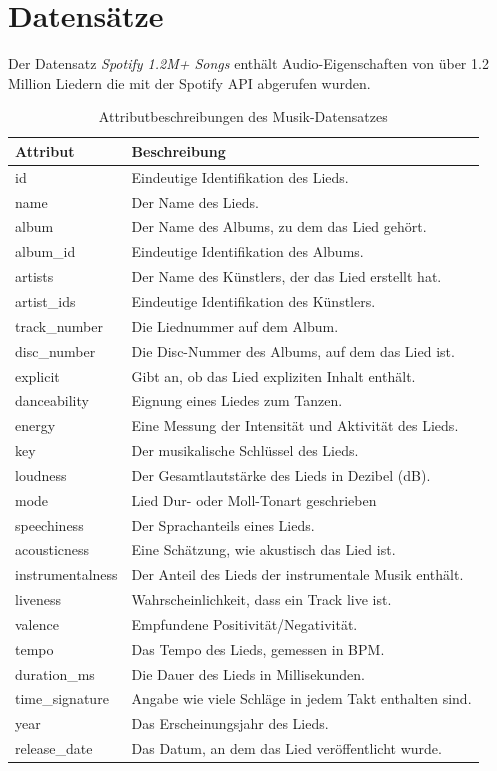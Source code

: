 \documentclass[conference]{IEEEtran}
\begin{document}
\section{Datensätze}
Der Datensatz \textit{Spotify 1.2M+ Songs} \cite{d2} enthält Audio-Eigenschaften von über 1.2 Million Liedern die mit der Spotify API abgerufen wurden.
\begin{table}[h]
\centering
\begin{tabular}{|l|l|}
\hline
Attribut & Beschreibung \\ \hline
id & Eindeutige Identifikation des Lieds. \\ \hline
name & Der Name des Lieds. \\ \hline
album & Der Name des Albums, zu dem das Lied gehört. \\ \hline
album\_id & Eindeutige Identifikation des Albums. \\ \hline
artists & Der Name des Künstlers, der das Lied erstellt hat. \\ \hline
artist\_ids & Eindeutige Identifikation des Künstlers. \\ \hline
track\_number & Die Liednummer auf dem Album. \\ \hline
disc\_number & Die Disc-Nummer des Albums, auf dem das Lied ist. \\ \hline
explicit & Gibt an, ob das Lied expliziten Inhalt enthält. \\ \hline
danceability & Eignung eines Liedes zum Tanzen. \\ \hline
energy & Eine Messung der Intensität und Aktivität des Lieds. \\ \hline
key & Der musikalische Schlüssel des Lieds. \\ \hline
loudness & Der Gesamtlautstärke des Lieds in Dezibel (dB). \\ \hline
mode & Lied Dur- oder Moll-Tonart geschrieben \\ \hline
speechiness & Der Sprachanteils eines Lieds. \\ \hline
acousticness & Eine Schätzung, wie akustisch das Lied ist. \\ \hline
instrumentalness & Der Anteil des Lieds der instrumentale Musik enthält. \\ \hline
liveness & Wahrscheinlichkeit, dass ein Track live ist. \\ \hline
valence & Empfundene Positivität/Negativität. \\ \hline
tempo & Das Tempo des Lieds, gemessen in BPM. \\ \hline
duration\_ms & Die Dauer des Lieds in Millisekunden. \\ \hline
time\_signature & Angabe wie viele Schläge in jedem Takt enthalten sind. \\ \hline
year & Das Erscheinungsjahr des Lieds. \\ \hline
release\_date & Das Datum, an dem das Lied veröffentlicht wurde. \\ \hline
\end{tabular}
\caption{Attributbeschreibungen des Musik-Datensatzes}
\label{tab:music_dataset}
\end{table}
\end{document}
